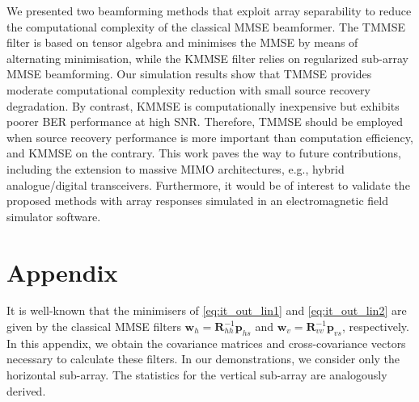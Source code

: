 \documentclass{cta-author}
\begin{document}
We presented two beamforming methods that exploit array separability to reduce the computational complexity of the classical MMSE beamformer. The TMMSE filter is based on tensor algebra and minimises the MMSE by means of alternating minimisation, while the KMMSE filter relies on regularized sub-array MMSE beamforming. Our simulation results show that TMMSE provides moderate computational complexity reduction with small source recovery degradation. By contrast, KMMSE is computationally inexpensive but exhibits poorer BER performance at high SNR.  Therefore, TMMSE should be employed when source recovery performance is more important than computation efficiency, and KMMSE on the contrary. This work paves the way to future contributions, including the extension to massive MIMO architectures, e.g., hybrid analogue/digital transceivers. Furthermore, it would be of interest to validate the proposed methods with array responses simulated in an electromagnetic field simulator software.

\section{Appendix} \label{app:proof_urra}

It is well-known that the minimisers of \eqref{eq:it_out_lin1} and \eqref{eq:it_out_lin2} are given by the classical MMSE filters $\bm{w}_h = \bm{R}_{hh}^{-1} \bm{p}_{hs}$ and $\bm{w}_v = \bm{R}_{vv}^{-1} \bm{p}_{vs}$, respectively. In this appendix, we obtain the covariance matrices and cross-covariance vectors necessary to calculate these filters.  In our demonstrations, we consider only the horizontal sub-array. The statistics for the vertical sub-array are analogously derived.
\end{document}
